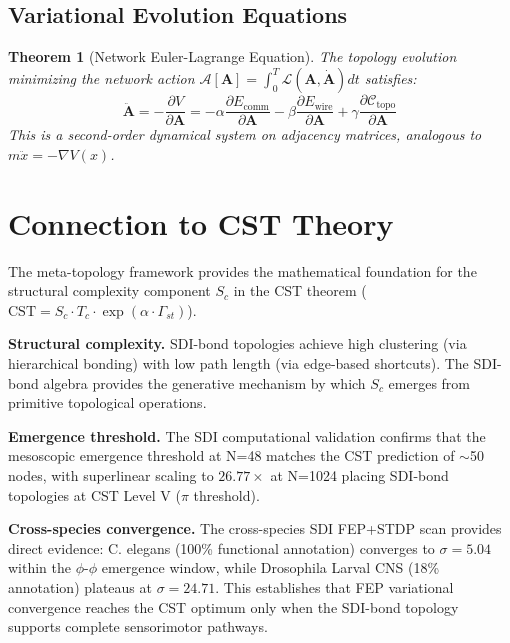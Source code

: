\documentclass[12pt]{article}
\newtheorem{theorem}{Theorem}[section]
\begin{document}
\subsection{Variational Evolution Equations}

\begin{theorem}[Network Euler-Lagrange Equation]
The topology evolution minimizing the network action
$\mathcal{A}[\mathbf{A}] = \int_0^T \mathcal{L}(\mathbf{A},
\dot{\mathbf{A}}) dt$ satisfies:
\begin{equation}
\ddot{\mathbf{A}} = -\frac{\partial V}{\partial \mathbf{A}} =
-\alpha\frac{\partial E_{\text{comm}}}{\partial\mathbf{A}} -
\beta\frac{\partial E_{\text{wire}}}{\partial\mathbf{A}} +
\gamma\frac{\partial\mathcal{C}_{\text{topo}}}{\partial\mathbf{A}}
\end{equation}
This is a second-order dynamical system on adjacency matrices,
analogous to $m\ddot{x} = -\nabla V(x)$.
\end{theorem}

\section{Connection to CST Theory}

The meta-topology framework provides the mathematical foundation for
the structural complexity component $S_c$ in the CST theorem
($\text{CST} = S_c \cdot T_c \cdot \exp(\alpha \cdot \Gamma_{st})$).

\textbf{Structural complexity.} SDI-bond topologies achieve high
clustering (via hierarchical bonding) with low path length (via
edge-based shortcuts). The SDI-bond algebra provides the generative
mechanism by which $S_c$ emerges from primitive topological
operations.

\textbf{Emergence threshold.} The SDI computational validation
confirms that the mesoscopic emergence threshold at N=48 matches
the CST prediction of $\sim$50 nodes, with superlinear scaling to
$26.77\times$ at N=1024 placing SDI-bond topologies at CST Level V
($\pi$ threshold).

\textbf{Cross-species convergence.} The cross-species SDI FEP+STDP
scan provides direct evidence: C. elegans (100\% functional
annotation) converges to $\sigma=5.04$ within the $\phi$-$\phi$
emergence window, while Drosophila Larval CNS (18\% annotation)
plateaus at $\sigma=24.71$. This establishes that FEP variational
convergence reaches the CST optimum only when the SDI-bond topology
supports complete sensorimotor pathways.
\end{document}
